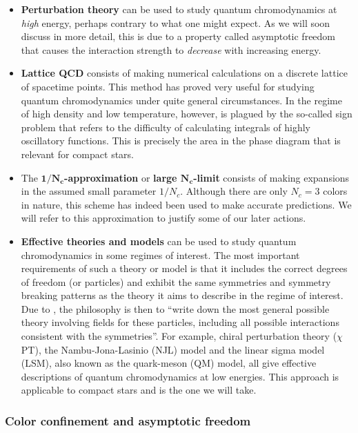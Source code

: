 \begin{itemize}
\item \textbf{Perturbation theory} can be used to study quantum chromodynamics at \emph{high} energy, perhaps contrary to what one might expect.
      As we will soon discuss in more detail, this is due to a property called asymptotic freedom that causes the interaction strength to \emph{decrease} with increasing energy.
\item \textbf{Lattice QCD} consists of making numerical calculations on a discrete lattice of spacetime points.
      This method has proved very useful for studying quantum chromodynamics under quite general circumstances.
      In the regime of high density and low temperature, however, is plagued by the so-called sign problem that refers to the difficulty of calculating integrals of highly oscillatory functions.
      This is precisely the area in the phase diagram that is relevant for compact stars.
\item The \textbf{$\bm{1/N_c}$-approximation} or \textbf{large $\bm{N_c}$-limit} consists of making expansions in the assumed small parameter $1/N_c$.
      Although there are only $N_c = 3$ colors in nature, this scheme has indeed been used to make accurate predictions.
      We will refer to this approximation to justify some of our later actions.
\item \textbf{Effective theories and models} can be used to study quantum chromodynamics in some regimes of interest.
      The most important requirements of such a theory or model is that it includes the correct degrees of freedom (or particles) and exhibit the same symmetries and symmetry breaking patterns as the theory it aims to describe in the regime of interest.
      Due to \cite{ref:weinberg_eft}, the philosophy is then to ``write down the most general possible theory involving fields for these particles, including all possible interactions consistent with the symmetries''.
      For example, chiral perturbation theory ($\chi$PT), the Nambu-Jona-Lasinio (NJL) model and the linear sigma model (LSM), also known as the quark-meson (QM) model, all give effective descriptions of quantum chromodynamics at low energies.
      This approach is applicable to compact stars and is the one we will take.
\end{itemize}

\subsubsection{Color confinement and asymptotic freedom \cite{ref:quark_bag_model}}

